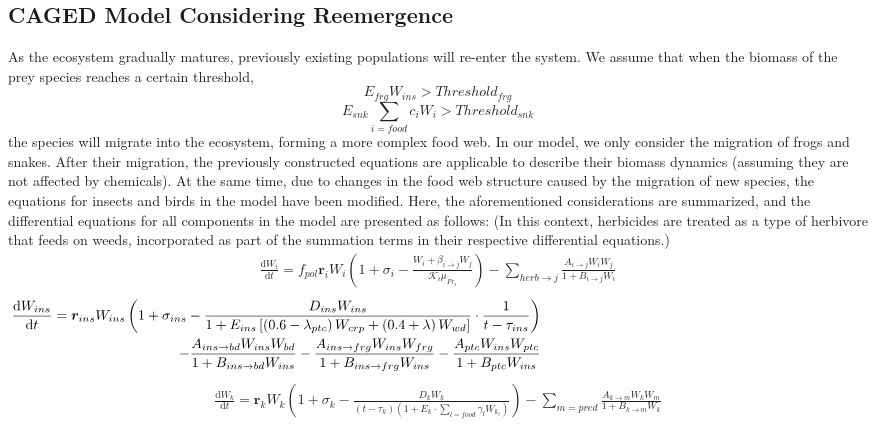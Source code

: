\documentclass{HZNUMCM}
\begin{document}
    \subsection{CAGED Model Considering Reemergence}
      As the ecosystem gradually matures, 
      previously existing populations will re-enter the system. 
      We assume that when the biomass of the prey species reaches a certain threshold,
      \begin{equation}
      E_{frg}W_{ins}>Threshold_{frg}
      \end{equation}
      \begin{equation}
      E_{snk}\sum_{i=food}{c_{i}W_{i}}>Threshold_{snk}
      \end{equation} 
      the species will migrate into the ecosystem, forming a more complex food web. 
      In our model, we only consider the migration of frogs and snakes. 
      After their migration, the previously constructed equations are applicable to describe their biomass dynamics 
      (assuming they are not affected by chemicals).
      At the same time, due to changes in the food web structure caused by the migration of new species, 
      the equations for insects and birds in the model have been modified. 
      Here, the aforementioned considerations are summarized, 
      and the differential equations for all components in the model are presented as follows: 
      (In this context, herbicides are treated as a type of herbivore that feeds on weeds, incorporated as part of the summation terms in their respective differential equations.)
      \begin{align}
        \frac{\mathrm{d}W_i}{\mathrm{d}t}=f_{pol}\boldsymbol{r}_iW_i\left( 1+\sigma _i-\frac{W_i+\beta _{i\rightarrow j}W_j}{\mathscr{K} _i\mu _{Fr_i}} \right) -\sum_{herb\rightarrow j}{\frac{A_{i\rightarrow j}W_iW_j}{1+B_{i\rightarrow j}W_i}}
      \end{align}
      \begin{equation}
        \begin{split}
        \frac{\mathrm{d}W_{ins}}{\mathrm{d}t}=\boldsymbol{r}_{ins}W_{ins}\left( 1+\sigma _{ins}-\frac{D_{ins}W_{ins}}{1+E_{ins}\left[ \left( 0.6-\lambda _{ptc} \right) W_{crp}+\left( 0.4+\lambda \right) W_{wd} \right]}\cdot \frac{1}{t-\tau _{ins}} \right)\\
        -\frac{A_{ins\rightarrow bd}W_{ins}W_{bd}}{1+B_{ins\rightarrow bd}W_{ins}}-\frac{A_{ins\rightarrow frg}W_{ins}W_{frg}}{1+B_{ins\rightarrow frg}W_{ins}}-\frac{A_{ptc}W_{ins}W_{ptc}}{1+B_{ptc}W_{ins}}&\hphantom{\sigma _{ins}-\frac{D_{ins}W_{ins}}{1+E_{ins}\left[ \left( 0.6-\lambda _{ptc} \right) W_{crp}+\left( 0.4+\lambda \right) W_{wd} \right]}}
        \end{split}
      \end{equation}
        \begin{align}  
        \frac{\mathrm{d}W_k}{\mathrm{d}t}=\boldsymbol{r}_kW_k\left( 1+\sigma _k-\frac{D_kW_k}{\left( t-\tau _k \right) \left( 1+E_k\cdot \sum_{l=food}{\gamma _lW_{k_l}} \right)} \right) -\sum_{m=pred}{\frac{A_{k\rightarrow m}W_kW_m}{1+B_{k\rightarrow m}W_k}}
      \end{align}
\end{document}
